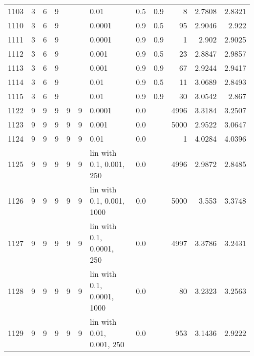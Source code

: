 \begin{longtable}{lrrrrrlrrrrr}
 1103 &       3 & 6 & 9 &   &   &                        0.01 &      0.5 &    0.9 &       8 &                 2.7808 &                 2.8321 \\
 1110 &       3 & 6 & 9 &   &   &                      0.0001 &      0.9 &    0.5 &      95 &                 2.9046 &                  2.922 \\
 1111 &       3 & 6 & 9 &   &   &                      0.0001 &      0.9 &    0.9 &       1 &                  2.902 &                 2.9025 \\
 1112 &       3 & 6 & 9 &   &   &                       0.001 &      0.9 &    0.5 &      23 &                 2.8847 &                 2.9857 \\
 1113 &       3 & 6 & 9 &   &   &                       0.001 &      0.9 &    0.9 &      67 &                 2.9244 &                 2.9417 \\
 1114 &       3 & 6 & 9 &   &   &                        0.01 &      0.9 &    0.5 &      11 &                 3.0689 &                 2.8493 \\
 1115 &       3 & 6 & 9 &   &   &                        0.01 &      0.9 &    0.9 &      30 &                 3.0542 &                  2.867 \\
 1122 &       9 & 9 & 9 & 9 & 9 &                      0.0001 &      0.0 &        &    4996 &                 3.3184 &                 3.2507 \\
 1123 &       9 & 9 & 9 & 9 & 9 &                       0.001 &      0.0 &        &    5000 &                 2.9522 &                 3.0647 \\
 1124 &       9 & 9 & 9 & 9 & 9 &                        0.01 &      0.0 &        &       1 &                 4.0284 &                 4.0396 \\
 1125 &       9 & 9 & 9 & 9 & 9 &    lin with 0.1, 0.001, 250 &      0.0 &        &    4996 &                 2.9872 &                 2.8485 \\
 1126 &       9 & 9 & 9 & 9 & 9 &   lin with 0.1, 0.001, 1000 &      0.0 &        &    5000 &                  3.553 &                 3.3748 \\
 1127 &       9 & 9 & 9 & 9 & 9 &   lin with 0.1, 0.0001, 250 &      0.0 &        &    4997 &                 3.3786 &                 3.2431 \\
 1128 &       9 & 9 & 9 & 9 & 9 &  lin with 0.1, 0.0001, 1000 &      0.0 &        &      80 &                 3.2323 &                 3.2563 \\
 1129 &       9 & 9 & 9 & 9 & 9 &   lin with 0.01, 0.001, 250 &      0.0 &        &     953 &                 3.1436 &                 2.9222 \\

\end{longtable}
